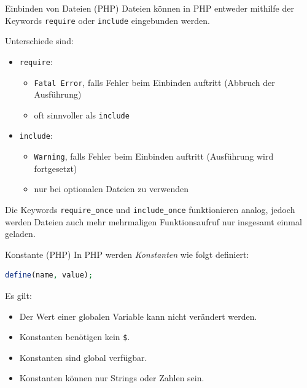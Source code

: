 \begin{defi}{Einbinden von Dateien (PHP)}
    Dateien können in PHP entweder mithilfe der Keywords \texttt{require} oder \texttt{include} eingebunden werden.

    Unterschiede sind:
    \begin{itemize}
        \item \texttt{require}:
              \begin{itemize}
                  \item \texttt{Fatal Error}, falls Fehler beim Einbinden auftritt (Abbruch der Ausführung)
                  \item oft sinnvoller als \texttt{include}
              \end{itemize}
        \item \texttt{include}:
              \begin{itemize}
                  \item \texttt{Warning}, falls Fehler beim Einbinden auftritt (Ausführung wird fortgesetzt)
                  \item nur bei optionalen Dateien zu verwenden
              \end{itemize}
    \end{itemize}

    Die Keywords \texttt{require\_once} und \texttt{include\_once} funktionieren analog, jedoch werden Dateien auch mehr mehrmaligen Funktionsaufruf nur insgesamt einmal geladen.
\end{defi}

\begin{defi}{Konstante (PHP)}
    In PHP werden \emph{Konstanten} wie folgt definiert:

    \begin{lstlisting}[language=php]
        define(name, value);
    \end{lstlisting}

    Es gilt:
    \begin{itemize}
        \item Der Wert einer globalen Variable kann nicht verändert werden.
        \item Konstanten benötigen kein \texttt{\$}.
        \item Konstanten sind global verfügbar.
        \item Konstanten können nur Strings oder Zahlen sein.
    \end{itemize}
\end{defi}

